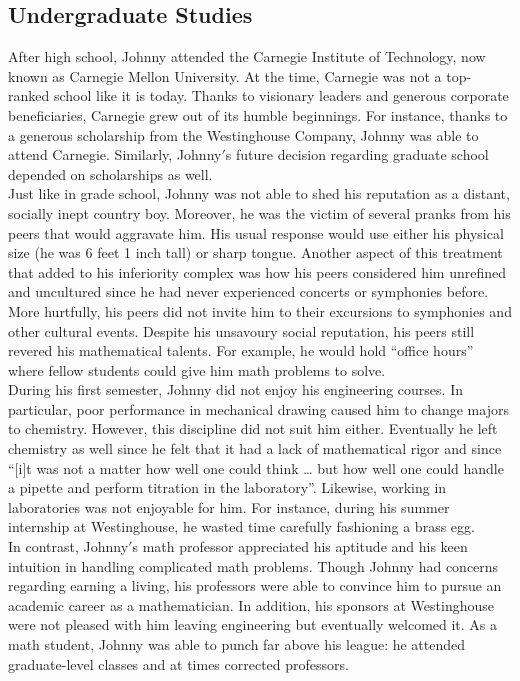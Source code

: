 \documentclass[12pt]{article}
\begin{document}
\subsection{Undergraduate Studies}
 
After high school, Johnny attended the Carnegie Institute of Technology, now known as Carnegie Mellon University. At the time, Carnegie was not a top-ranked school like it is today. Thanks to visionary leaders and generous corporate beneficiaries, Carnegie grew out of its humble beginnings. For instance, thanks to a generous scholarship from the Westinghouse Company, Johnny was able to attend Carnegie. Similarly, Johnny$'$s future decision regarding graduate school depended on scholarships as well.\\

Just like in grade school, Johnny was not able to shed his reputation as a distant, socially inept country boy. Moreover, he was the victim of several pranks from his peers that would aggravate him. His usual response would use either his physical size (he was 6 feet 1 inch tall) or sharp tongue. Another aspect of this treatment that added to his inferiority complex was how his peers considered him unrefined and uncultured since he had never experienced concerts or symphonies before. More hurtfully, his peers did not invite him to their excursions to symphonies and other cultural events. Despite his unsavoury social reputation, his peers still revered his mathematical talents. For example, he would hold ``office hours'' where fellow students could give him math problems to solve.\\

During his first semester, Johnny did not enjoy his engineering courses. In particular, poor performance in mechanical drawing caused him to change majors to chemistry. However, this discipline did not suit him either. Eventually he left chemistry as well since he felt that it had a lack of mathematical rigor and since ``[i]t was not a matter how well one could think … but how well one could handle a pipette and perform titration in the laboratory''. Likewise, working in laboratories was not enjoyable for him. For instance, during his summer internship at Westinghouse, he wasted time carefully fashioning a brass egg.\\

In contrast, Johnny$'$s math professor appreciated his aptitude and his keen intuition in handling complicated math problems. Though Johnny had concerns regarding earning a living, his professors were able to convince him to pursue an academic career as a mathematician. In addition, his sponsors at Westinghouse were not pleased with him leaving engineering but eventually welcomed it. As a math student, Johnny was able to punch far above his league: he attended graduate-level classes and at times corrected professors.\\
\end{document}
